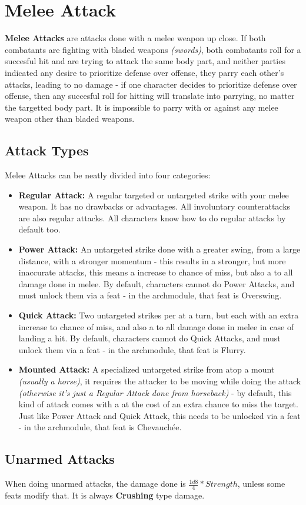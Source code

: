 \section{Melee Attack}
\textbf{Melee Attacks} are attacks done with a melee weapon up close. If both combatants are fighting with bladed weapons \textit{(swords)}, both combatants roll for a succesful hit and are trying to attack the same body part, and neither parties indicated any desire to prioritize defense over offense, they parry each other's attacks, leading to no damage - if one character decides to prioritize defense over offense, then any succesful roll for hitting will translate into parrying, no matter the targetted body part. It is impossible to parry with or against any melee weapon other than bladed weapons.
\subsection{Attack Types}
Melee Attacks can be neatly divided into four categories:
\begin{itemize}
  \item \textbf{Regular Attack:} A regular targeted or untargeted strike with your melee weapon. It has no drawbacks or advantages. All involuntary counterattacks are also regular attacks. All characters know how to do regular attacks by default too.
  \item \textbf{Power Attack:} An untargeted strike done with a greater swing, from a large distance, with a stronger momentum - this results in a stronger, but more inaccurate attacks, this means a  increase to chance of miss, but also a  to all damage done in melee. By default, characters cannot do Power Attacks, and must unlock them via a feat - in the archmodule, that feat is Overswing.
  \item \textbf{Quick Attack:} Two untargeted strikes per at a turn, but each with an extra  increase to chance of miss, and also a  to all damage done in melee in case of landing a hit. By default, characters cannot do Quick Attacks, and must unlock them via a feat - in the archmodule, that feat is Flurry.
  \item \textbf{Mounted Attack:} A specialized untargeted strike from atop a mount \textit{(usually a horse)}, it requires the attacker to be moving while doing the attack \textit{(otherwise it's just a Regular Attack done from horseback)} - by default, this kind of attack comes with a  at the cost of an extra  chance to miss the target. Just like Power Attack and Quick Attack, this needs to be unlocked via a feat - in the archmodule, that feat is Chevauchée.
\end{itemize}
\subsection{Unarmed Attacks}
When doing unarmed attacks, the damage done is $\frac{1d8}{4}*Strength$, unless some feats modify that. It is always \textbf{Crushing} type damage.
